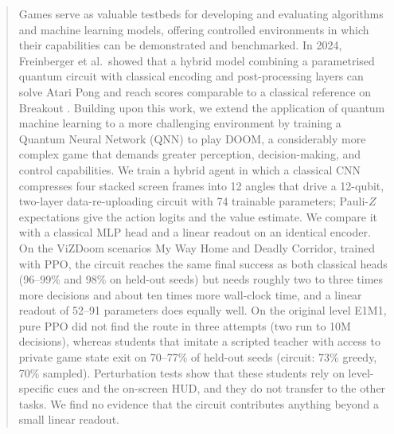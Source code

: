 \documentclass[10pt, a4paper]{article}
\begin{document}
\begin{abstract}
Games serve as valuable testbeds for developing and evaluating algorithms and machine learning models, offering controlled environments in which their capabilities can be demonstrated and benchmarked. In 2024, Freinberger et al.\ showed that a hybrid model combining a parametrised quantum circuit with classical encoding and post-processing layers can solve Atari Pong and reach scores comparable to a classical reference on Breakout \cite{freinberger_quantum_2024}. Building upon this work, we extend the application of quantum machine learning to a more challenging environment by training a Quantum Neural Network (QNN) to play DOOM, a considerably more complex game that demands greater perception, decision-making, and control capabilities.
We train a hybrid agent in which a classical CNN compresses four stacked screen frames into 12 angles that drive a 12-qubit, two-layer data-re-uploading circuit with 74 trainable parameters; Pauli-$Z$ expectations give the action logits and the value estimate. We compare it with a classical MLP head and a linear readout on an identical encoder. On the ViZDoom scenarios My Way Home and Deadly Corridor, trained with PPO, the circuit reaches the same final success as both classical heads (96--99\% and 98\% on held-out seeds) but needs roughly two to three times more decisions and about ten times more wall-clock time, and a linear readout of 52--91 parameters does equally well. On the original level E1M1, pure PPO did not find the route in three attempts (two run to 10M decisions), whereas students that imitate a scripted teacher with access to private game state exit on 70--77\% of held-out seeds (circuit: 73\% greedy, 70\% sampled). Perturbation tests show that these students rely on level-specific cues and the on-screen HUD, and they do not transfer to the other tasks. We find no evidence that the circuit contributes anything beyond a small linear readout.
\noindent

\end{abstract}
\end{document}
